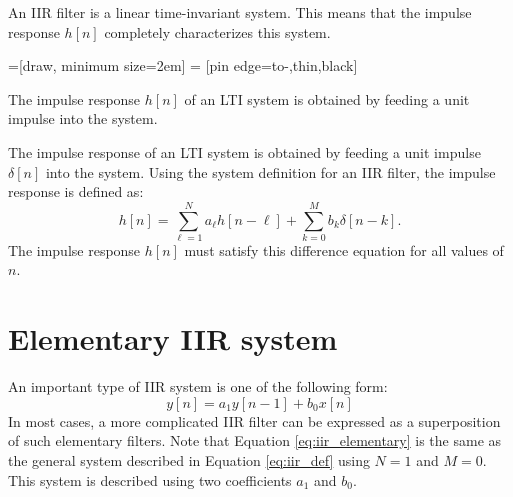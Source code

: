 An IIR filter is a linear time-invariant system. This means that the
impulse response $h[n]$ completely characterizes this system.

=[draw, minimum size=2em]
 = [pin edge={to-,thin,black}]

\begin{marginfigure}
    \begin{center}
    \end{center}
    \caption{The impulse response $h[n]$ of an LTI system is obtained by feeding a unit impulse into the system.}
\end{marginfigure}

The impulse response of an LTI system is obtained by feeding a unit
impulse $\delta[n]$ into the system. Using the system definition for
an IIR filter, the impulse response is defined as:
\begin{equation}
    h[n] = \sum_{\ell=1}^{N} a_\ell h[n-\ell] + \sum_{k=0}^{M} b_k \delta[n-k].
\end{equation}
The impulse response $h[n]$ must satisfy this difference equation for
all values of $n$.

\section{Elementary IIR system}

An important type of IIR system is one of the following form:
\begin{equation}
    y[n] = a_1 y[n-1] + b_0 x[n]
    \label{eq:iir_elementary}
\end{equation}
In most cases, a more complicated IIR filter can be expressed as a
superposition of such elementary filters. Note that
Equation \ref{eq:iir_elementary} is the same as the general system
described in Equation \ref{eq:iir_def} using $N=1$ and $M=0$. This
system is described using two coefficients $a_1$ and $b_0$.

